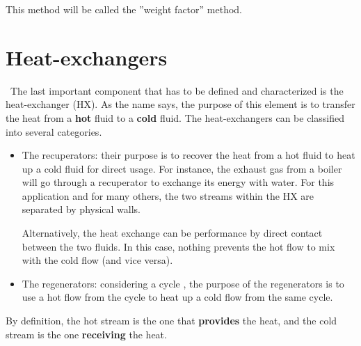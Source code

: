 This method will be called the ''weight factor'' method.
\section{Heat-exchangers}
\newpage
\quad\ The last important component that has to be defined and characterized is the heat-exchanger (HX). As the name says, the purpose of this element is to transfer the heat from a \textbf{hot} fluid to a \textbf{cold} fluid. The heat-exchangers can be classified into several categories\cite{Ngendakumana2018}.

\begin{itemize}
    \item The recuperators: their purpose is to recover the heat from a hot fluid to heat up a cold fluid for direct usage. For instance, the exhaust gas from a boiler will go through a recuperator to exchange its energy with water. For this application and for many others, the two streams within the HX are separated by physical walls.

          Alternatively, the heat exchange can be performance by direct contact between the two fluids. In this case, nothing prevents the hot flow to mix with the cold flow (and vice versa).
    \item The regenerators: considering a cycle , the purpose of the regenerators is to use a hot flow from the cycle to heat up a cold flow from the same cycle.
\end{itemize}

By definition, the hot stream is the one that \textbf{provides} the heat, and the cold stream is the one \textbf{receiving} the heat.

